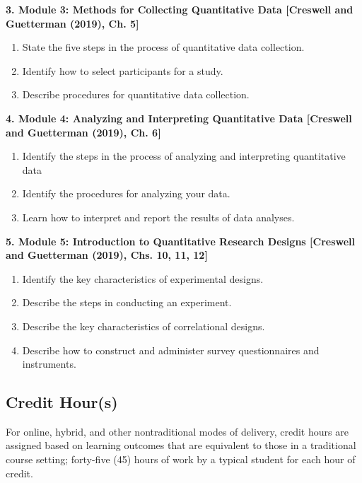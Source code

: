\documentclass[
]{article}
\providecommand{\tightlist}{%
  \setlength{\itemsep}{0pt}\setlength{\parskip}{0pt}}
\begin{document}
\textbf{3. Module 3: Methods for Collecting Quantitative Data
{[}Creswell and Guetterman (2019), Ch. 5{]}}

\begin{enumerate}
\def\labelenumi{\arabic{enumi}.}
\tightlist
\item
  State the five steps in the process of quantitative data collection.
\item
  Identify how to select participants for a study.
\item
  Describe procedures for quantitative data collection.
\end{enumerate}

\textbf{4. Module 4: Analyzing and Interpreting Quantitative Data
{[}Creswell and Guetterman (2019), Ch. 6{]}}

\begin{enumerate}
\def\labelenumi{\arabic{enumi}.}
\tightlist
\item
  Identify the steps in the process of analyzing and interpreting
  quantitative data
\item
  Identify the procedures for analyzing your data.
\item
  Learn how to interpret and report the results of data analyses.
\end{enumerate}

\textbf{5. Module 5: Introduction to Quantitative Research Designs
{[}Creswell and Guetterman (2019), Chs. 10, 11, 12{]}}

\begin{enumerate}
\def\labelenumi{\arabic{enumi}.}
\tightlist
\item
  Identify the key characteristics of experimental designs.
\item
  Describe the steps in conducting an experiment.
\item
  Describe the key characteristics of correlational designs.
\item
  Describe how to construct and administer survey questionnaires and
  instruments.
\end{enumerate}

\subsection{Credit Hour(s)}

For online, hybrid, and other nontraditional modes of delivery, credit
hours are assigned based on learning outcomes that are equivalent to
those in a traditional course setting; forty-five (45) hours of work by
a typical student for each hour of credit.
\end{document}
